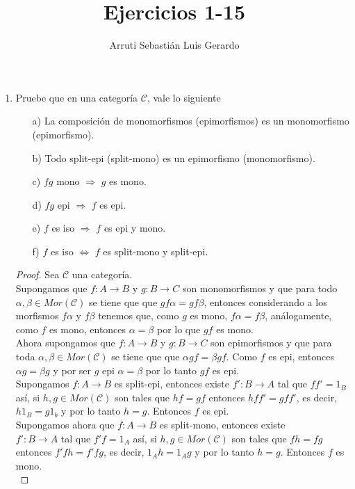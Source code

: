 \documentclass{article}
\title{Ejercicios 1-15}
\author{Arruti Sebastián Luis Gerardo}
\begin{document}
	\begin{enumerate}[label=\textbf{Ej \arabic*.}]
		\item Pruebe que en una categoría $\mathscr{C}$, vale lo siguiente
        \begin{itemize}
	\item[a)] La composición de monomorfismos (epimorfismos) es un monomorfismo (epimorfismo).
	\item[b)] Todo split-epi (split-mono) es un epimorfismo (monomorfismo).
	\item[c)] $fg$ mono $\Rightarrow$ $g$ es mono.
	\item[d)] $fg$ epi $\Rightarrow$ $f$ es epi.
	\item[e)] $f$ es iso $\Rightarrow$ $f$ es epi y mono.
	\item[f)]  $f$ es iso $\iff$ $f$ es split-mono y split-epi.
\end{itemize}
\begin{proof}
Sea $\mathscr{C}$ una categoría.\\
 Supongamos que $f\colon A\longrightarrow B$ y $g\colon B\longrightarrow C$ son monomorfismos y que para todo $\alpha,\beta\in
Mor(\mathscr{C})$ se tiene que que $gf\alpha =gf\beta$, entonces considerando a los morfismos $f\alpha$ y $f\beta$ tenemos que, como $g$ es mono, 
$f\alpha=f\beta$, análogamente, como $f$ es mono, entonces $\alpha=\beta$ por lo que $gf$ es mono.\\

Ahora supongamos que $f\colon A\longrightarrow B$ y $g\colon B\longrightarrow C$ son epimorfismos y que para toda $\alpha,\beta\in
Mor(\mathscr{C})$ se tiene que que $\alpha gf =\beta gf$. Como $f$ es epi, entonces $\alpha g=\beta g$ y por ser $g$ epi $\alpha=\beta$ por lo tanto 
$gf$ es epi.\\

 Supongamos $f\colon A\longrightarrow B$ es split-epi, entonces existe $f'\colon B\longrightarrow A$ tal que $ff'=1_B$ así, si 
$h,g\in Mor(\mathscr{C})$ son tales que $hf=gf$ entonces $hff'=gff'$, es decir, $h1_B=g1_b$ y por lo tanto $h=g$. Entonces $f$ es epi.\\

 Supongamos ahora que $f\colon A\longrightarrow B$ es split-mono, entonces existe \\ $f'\colon B\longrightarrow A$ tal que $f'f=1_A$ así, si 
$h,g\in Mor(\mathscr{C})$ son tales que $fh=fg$ entonces $f'fh=f'fg$, es decir, $1_A h=1_A g$ y por lo tanto $h=g$. Entonces $f$ es mono.\\


\end{proof}
\end{enumerate}
\end{document}
